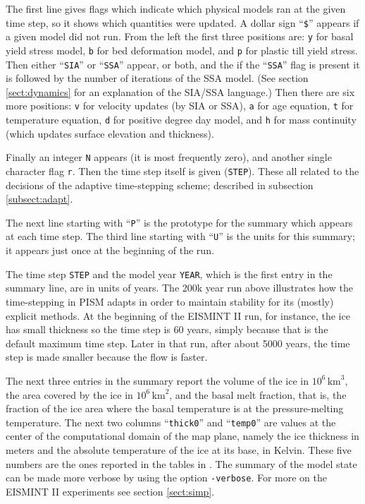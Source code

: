 \documentclass[11pt,final]{amsart}
\renewcommand{\t}[1]{\texttt{#1}}
\begin{document}
\noindent The first line gives flags which indicate which physical models ran at the given time step, so it shows which quantities were updated.  A dollar sign ``\t{\$}'' appears if a given model did not run.  From the left the first three positions are: \t{y} for basal yield stress model, \t{b} for bed deformation model, and \t{p} for plastic till yield stress.  Then either ``\verb|SIA|'' or ``\verb|SSA|'' appear, or both, and the if the ``\verb|SSA|'' flag is present it is followed by the number of iterations of the SSA model.  (See section \ref{sect:dynamics} for an explanation of the SIA/SSA language.)  Then there are six more positions: \t{v} for velocity updates (by SIA or SSA), \t{a} for age equation, \t{t} for temperature equation, \t{d} for positive degree day model, and \t{h} for mass continuity (which updates surface elevation and thickness).  

Finally an integer \t{N} appears (it is most frequently zero), and another single character flag \t{r}.  Then the time step itself is given (\t{STEP}).  These all related to the decisions of the adaptive time-stepping scheme; described in subsection \ref{subsect:adapt}.

The next line starting with ``\t{P}'' is the prototype for the summary which appears at each time step.  The third line starting with ``\t{U}'' is the units for this summary; it appears just once at the beginning of the run.

The time step \t{STEP} and the model year \t{YEAR}, which is the first entry in the summary line, are in units of years.  The 200k year run above illustrates how the time-stepping in PISM adapts in order to maintain stability for its (mostly) explicit methods.  At the beginning of the EISMINT II run, for instance, the ice has small thickness so the time step is 60 years, simply because that is the default maximum time step.  Later in that run, after about 5000 years, the time step is made smaller because the flow is faster.

The next three entries in the summary report the volume of the ice in $10^6 \,\text{km}^3$, the area covered by the ice in $10^6\,\text{km}^2$, and the basal melt fraction, that is, the fraction of the ice area where the basal temperature is at the pressure-melting temperature.  The next two columns ``\texttt{thick0}'' and ``\texttt{temp0}'' are values at the center of the computational domain of the map plane, namely the ice thickness in meters and the absolute temperature of the ice at its base, in Kelvin.  These five numbers are the ones reported in the tables in \cite{EISMINT00}.  The summary of the model state can be made more verbose by using the option \verb|-verbose|.  For more on the EISMINT II experiments see section \ref{sect:simp}.
\end{document}
